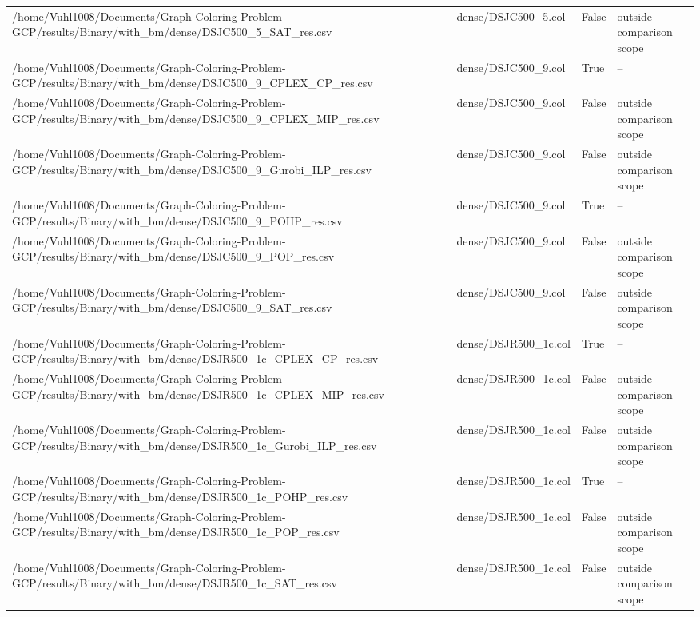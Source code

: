 \begin{table}[htbp]
\begin{tabular}{llll}
/home/Vuhl1008/Documents/Graph-Coloring-Problem-GCP/results/Binary/with\_bm/dense/DSJC500\_5\_SAT\_res.csv & dense/DSJC500\_5.col & False & outside comparison scope \\
/home/Vuhl1008/Documents/Graph-Coloring-Problem-GCP/results/Binary/with\_bm/dense/DSJC500\_9\_CPLEX\_CP\_res.csv & dense/DSJC500\_9.col & True & -- \\
/home/Vuhl1008/Documents/Graph-Coloring-Problem-GCP/results/Binary/with\_bm/dense/DSJC500\_9\_CPLEX\_MIP\_res.csv & dense/DSJC500\_9.col & False & outside comparison scope \\
/home/Vuhl1008/Documents/Graph-Coloring-Problem-GCP/results/Binary/with\_bm/dense/DSJC500\_9\_Gurobi\_ILP\_res.csv & dense/DSJC500\_9.col & False & outside comparison scope \\
/home/Vuhl1008/Documents/Graph-Coloring-Problem-GCP/results/Binary/with\_bm/dense/DSJC500\_9\_POHP\_res.csv & dense/DSJC500\_9.col & True & -- \\
/home/Vuhl1008/Documents/Graph-Coloring-Problem-GCP/results/Binary/with\_bm/dense/DSJC500\_9\_POP\_res.csv & dense/DSJC500\_9.col & False & outside comparison scope \\
/home/Vuhl1008/Documents/Graph-Coloring-Problem-GCP/results/Binary/with\_bm/dense/DSJC500\_9\_SAT\_res.csv & dense/DSJC500\_9.col & False & outside comparison scope \\
/home/Vuhl1008/Documents/Graph-Coloring-Problem-GCP/results/Binary/with\_bm/dense/DSJR500\_1c\_CPLEX\_CP\_res.csv & dense/DSJR500\_1c.col & True & -- \\
/home/Vuhl1008/Documents/Graph-Coloring-Problem-GCP/results/Binary/with\_bm/dense/DSJR500\_1c\_CPLEX\_MIP\_res.csv & dense/DSJR500\_1c.col & False & outside comparison scope \\
/home/Vuhl1008/Documents/Graph-Coloring-Problem-GCP/results/Binary/with\_bm/dense/DSJR500\_1c\_Gurobi\_ILP\_res.csv & dense/DSJR500\_1c.col & False & outside comparison scope \\
/home/Vuhl1008/Documents/Graph-Coloring-Problem-GCP/results/Binary/with\_bm/dense/DSJR500\_1c\_POHP\_res.csv & dense/DSJR500\_1c.col & True & -- \\
/home/Vuhl1008/Documents/Graph-Coloring-Problem-GCP/results/Binary/with\_bm/dense/DSJR500\_1c\_POP\_res.csv & dense/DSJR500\_1c.col & False & outside comparison scope \\
/home/Vuhl1008/Documents/Graph-Coloring-Problem-GCP/results/Binary/with\_bm/dense/DSJR500\_1c\_SAT\_res.csv & dense/DSJR500\_1c.col & False & outside comparison scope \\

\end{tabular}
\end{table}
